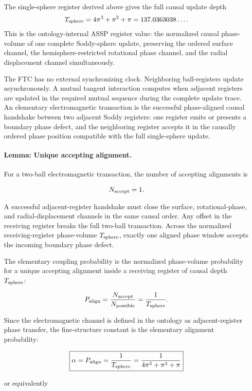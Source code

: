 \documentclass[11pt,a4paper]{article}
\begin{document}
The single-sphere register derived above gives the full causal update depth
\[
T_{\rm sphere}=4\pi^3+\pi^2+\pi=137.0363038\ldots .
\]
This is the ontology-internal ASSP register value: the normalized causal phase-volume of one complete Soddy-sphere update, preserving the ordered surface channel, the hemisphere-restricted rotational phase channel, and the radial displacement channel simultaneously.

The FTC has no external synchronizing clock. Neighboring ball-registers update asynchronously. A mutual tangent interaction computes when adjacent registers are updated in the required mutual sequence during the complete update trace. An elementary electromagnetic transaction is the successful phase-aligned causal handshake between two adjacent Soddy registers: one register emits or presents a boundary phase defect, and the neighboring register accepts it in the causally ordered phase position compatible with the full single-sphere update.

\paragraph{Lemma: Unique accepting alignment.}

For a two-ball electromagnetic transaction, the number of accepting alignments is

\[
N_{\rm accept}=1.
\]

A successful adjacent-register handshake must close the surface, rotational-phase, and radial-displacement channels in the same causal order. Any offset in the receiving register breaks the full two-ball transaction. Across the normalized receiving-register phase-volume \(T_{\rm sphere}\), exactly one aligned phase window accepts the incoming boundary phase defect.

The elementary coupling probability is the normalized phase-volume probability for a unique accepting alignment inside a receiving register of causal depth \(T_{\rm sphere}\):

\[
P_{\rm align}
=
\frac{N_{\rm accept}}{N_{\rm possible}}
=
\frac{1}{T_{\rm sphere}}.
\]

Since the electromagnetic channel is defined in the ontology as adjacent-register phase transfer, the fine-structure constant is the elementary alignment probability:

\[
\boxed{
\alpha
=
P_{\rm align}
=
\frac{1}{T_{\rm sphere}}
=
\frac{1}{4\pi^3+\pi^2+\pi}
}
\]

or equivalently
\end{document}
